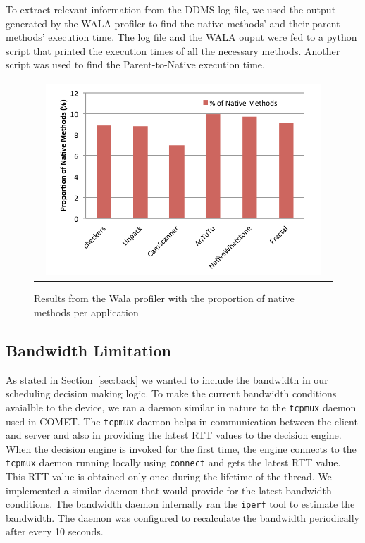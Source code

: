 To extract relevant information from the DDMS log file, we used the output generated by the WALA profiler to find the native methods' and their
parent methods' execution time. The log file and the WALA ouput were fed to a python script that printed the execution times of all the
necessary methods. Another script was used to find the Parent-to-Native execution time.

\begin{figure} [thf*]
\centering
\begin{tabular}{c}
\begin{minipage}[b]{0.5\textwidth}
\includegraphics[width=0.95\textwidth]{figs/native_total.pdf}
\end{minipage}
\end{tabular}
\caption{Results from the Wala profiler with the proportion of native methods per application}
\label{fig:native_total}
\end{figure}

\subsection{Bandwidth Limitation}
As stated in Section~\ref{sec:back} we wanted to include the bandwidth in our scheduling decision making logic. To make the current bandwidth conditions avaialble to the device, we ran a daemon similar in nature to the \texttt{tcpmux} daemon used in COMET. The \texttt{tcpmux} daemon helps in communication between the client and server and also in providing the latest RTT values to the decision engine. When the decision engine is invoked for the first time, the engine connects to the \texttt{tcpmux} daemon running locally using \texttt{connect} and gets the latest RTT value. This RTT value is obtained only once during the lifetime of the thread. We implemented a similar daemon that would provide for the latest bandwidth conditions. The bandwidth daemon internally ran the \texttt{iperf} tool to estimate the bandwidth. The daemon was configured to recalculate the bandwidth periodically after every 10 seconds.

